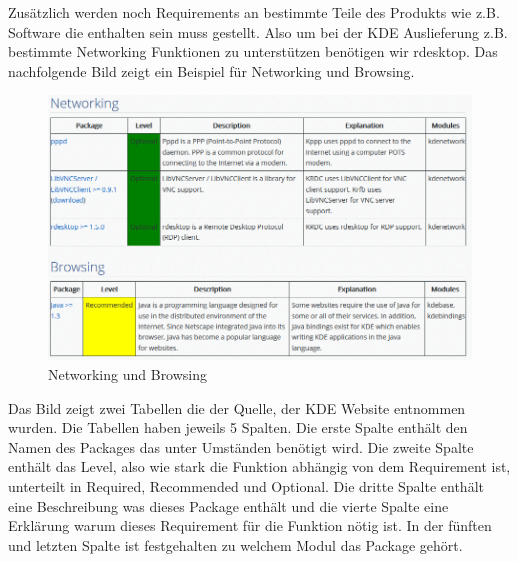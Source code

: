 \documentclass[10pt,a4paper,twocolumn]{article}
\begin{document}
Zusätzlich werden noch Requirements an bestimmte Teile des Produkts wie z.B.
Software die enthalten sein muss gestellt. Also um bei der KDE Auslieferung z.B.
bestimmte Networking Funktionen zu unterstützen benötigen wir rdesktop. Das
nachfolgende Bild zeigt ein Beispiel für Networking und Browsing.
\begin{figure}[h]
\includegraphics[width=\columnwidth]{images/KDE_Net_B.png}
\caption{Networking und Browsing\cite{6}}
\end{figure}
Das Bild zeigt zwei Tabellen die der Quelle, der KDE
Website entnommen wurden\cite{6}.
Die Tabellen haben jeweils 5 Spalten. Die erste Spalte enthält den Namen des
Packages das unter Umständen benötigt wird. Die zweite Spalte enthält das Level,
also wie stark die Funktion abhängig von dem Requirement ist, unterteilt in
Required, Recommended und Optional. Die dritte Spalte enthält eine Beschreibung
was dieses Package enthält und die vierte Spalte eine Erklärung warum dieses
Requirement für die Funktion nötig ist. In der fünften und letzten Spalte ist
festgehalten zu welchem Modul das Package gehört.
\end{document}

